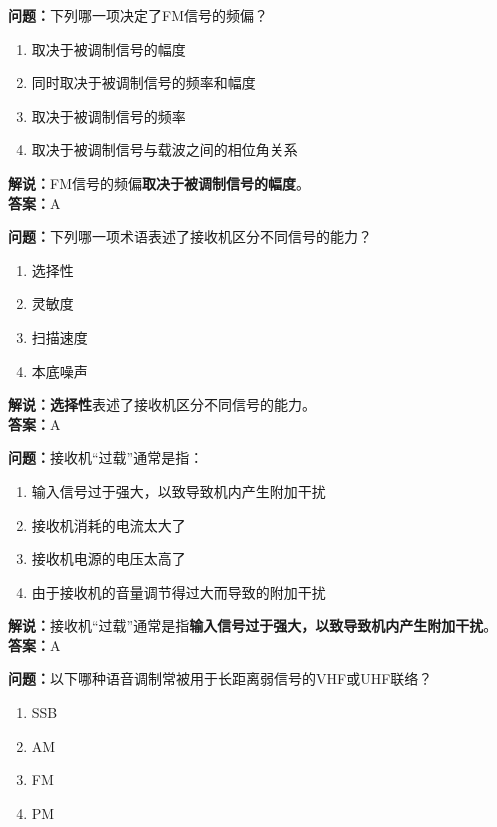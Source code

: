 \textbf{问题：}下列哪一项决定了FM信号的频偏？

\begin{enumerate}[label=\Alph*), leftmargin=1.5cm]
	\item 取决于被调制信号的幅度
	\item 同时取决于被调制信号的频率和幅度
	\item 取决于被调制信号的频率
	\item 取决于被调制信号与载波之间的相位角关系
\end{enumerate}

\textbf{解说：}FM信号的频偏\textbf{取决于被调制信号的幅度}。\\\textbf{答案：}A%



\textbf{问题：}下列哪一项术语表述了接收机区分不同信号的能力？

\begin{enumerate}[label=\Alph*), leftmargin=1.5cm]
	\item 选择性
	\item 灵敏度
	\item 扫描速度
	\item 本底噪声
\end{enumerate}

\textbf{解说：}\textbf{选择性}表述了接收机区分不同信号的能力。\\\textbf{答案：}A%



\textbf{问题：}接收机“过载”通常是指：

\begin{enumerate}[label=\Alph*), leftmargin=1.5cm]
	\item 输入信号过于强大，以致导致机内产生附加干扰
	\item 接收机消耗的电流太大了
	\item 接收机电源的电压太高了
	\item 由于接收机的音量调节得过大而导致的附加干扰
\end{enumerate}

\textbf{解说：}接收机“过载”通常是指\textbf{输入信号过于强大，以致导致机内产生附加干扰}。\\\textbf{答案：}A%



\textbf{问题：}以下哪种语音调制常被用于长距离弱信号的VHF或UHF联络？

\begin{enumerate}[label=\Alph*), leftmargin=1.5cm]
	\item SSB
	\item AM
	\item FM
	\item PM
\end{enumerate}

